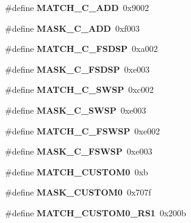 \begin{DoxyCompactItemize}
\#define {\bfseries M\+A\+T\+C\+H\+\_\+\+C\+\_\+\+A\+DD}~0x9002
\item 
\mbox{\label{riscv-utility_8h_a1c50271435daccda2368a906cba47b0a}} 
\#define {\bfseries M\+A\+S\+K\+\_\+\+C\+\_\+\+A\+DD}~0xf003
\item 
\mbox{\label{riscv-utility_8h_aa15eb7e71b116ab1134c539c7b0ac741}} 
\#define {\bfseries M\+A\+T\+C\+H\+\_\+\+C\+\_\+\+F\+S\+D\+SP}~0xa002
\item 
\mbox{\label{riscv-utility_8h_a03b7f223f2ebcb7ace34e77068c4f216}} 
\#define {\bfseries M\+A\+S\+K\+\_\+\+C\+\_\+\+F\+S\+D\+SP}~0xe003
\item 
\mbox{\label{riscv-utility_8h_ae9a98966de214b95f68e9766dda63798}} 
\#define {\bfseries M\+A\+T\+C\+H\+\_\+\+C\+\_\+\+S\+W\+SP}~0xc002
\item 
\mbox{\label{riscv-utility_8h_a48cec6166a3f7bb7851c75362f3335d9}} 
\#define {\bfseries M\+A\+S\+K\+\_\+\+C\+\_\+\+S\+W\+SP}~0xe003
\item 
\mbox{\label{riscv-utility_8h_a4429464ab0eb50beb71c284f330d8ee5}} 
\#define {\bfseries M\+A\+T\+C\+H\+\_\+\+C\+\_\+\+F\+S\+W\+SP}~0xe002
\item 
\mbox{\label{riscv-utility_8h_aa36100f1d592fb6d0515a0357a477620}} 
\#define {\bfseries M\+A\+S\+K\+\_\+\+C\+\_\+\+F\+S\+W\+SP}~0xe003
\item 
\mbox{\label{riscv-utility_8h_a2673f21cd8a58b1f6ef8a2ae6af8c281}} 
\#define {\bfseries M\+A\+T\+C\+H\+\_\+\+C\+U\+S\+T\+O\+M0}~0xb
\item 
\mbox{\label{riscv-utility_8h_a3bd3f57c05f8eb902436566ba152763d}} 
\#define {\bfseries M\+A\+S\+K\+\_\+\+C\+U\+S\+T\+O\+M0}~0x707f
\item 
\mbox{\label{riscv-utility_8h_a4db64620e419797b9fe50bca25159eb9}} 
\#define {\bfseries M\+A\+T\+C\+H\+\_\+\+C\+U\+S\+T\+O\+M0\+\_\+\+R\+S1}~0x200b
\item 
\mbox{\label{riscv-utility_8h_adc30ca8088e20117266f7165d9682b67}} 

\end{DoxyCompactItemize}
